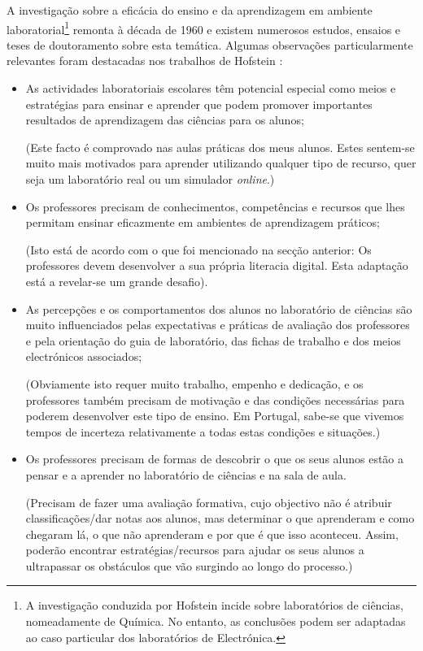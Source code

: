 A investigação sobre a eficácia do ensino e da aprendizagem em ambiente laboratorial\footnote{\label{Hofstein}A investigação conduzida por Hofstein \cite{Hofstein} incide sobre laboratórios de ciências, nomeadamente de Química. No entanto, as conclusões podem ser adaptadas ao caso particular dos laboratórios de Electrónica.} remonta à década de 1960 e existem numerosos estudos, ensaios e teses de doutoramento sobre esta temática. Algumas observações particularmente relevantes foram destacadas nos trabalhos de Hofstein \cite{Hofstein}:
\begin{itemize}
    \item As actividades laboratoriais escolares têm potencial especial como meios e estratégias para ensinar e aprender que podem promover importantes resultados de aprendizagem das ciências para os alunos;

          (Este facto é comprovado nas aulas práticas dos meus alunos. Estes sentem-se muito mais motivados para aprender utilizando qualquer tipo de recurso, quer seja um laboratório real ou um simulador \textit{online}.)
    \item Os professores precisam de conhecimentos, competências e recursos que lhes permitam ensinar eficazmente em ambientes de aprendizagem práticos;

          (Isto está de acordo com o que foi mencionado na secção anterior: Os professores devem desenvolver a sua própria literacia digital. Esta adaptação está a revelar-se um grande desafio).
    \item As percepções e os comportamentos dos alunos no laboratório de ciências são muito influenciados pelas expectativas e práticas de avaliação dos professores e pela orientação do guia de laboratório, das fichas de trabalho e dos meios electrónicos associados;

          (Obviamente isto requer muito trabalho, empenho e dedicação, e os professores também precisam de motivação e das condições necessárias para poderem desenvolver este tipo de ensino. Em Portugal, sabe-se que vivemos tempos de incerteza relativamente a todas estas condições e situações.)

    \item Os professores precisam de formas de descobrir o que os seus alunos estão a pensar e a aprender no laboratório de ciências e na sala de aula.

          (Precisam de fazer uma avaliação formativa, cujo objectivo não é atribuir classificações/dar notas aos alunos, mas determinar o que aprenderam e como chegaram lá, o que não aprenderam e por que é que isso aconteceu. Assim, poderão encontrar estratégias/recursos para ajudar os seus alunos a ultrapassar os obstáculos que vão surgindo ao longo do processo.)
\end{itemize}
